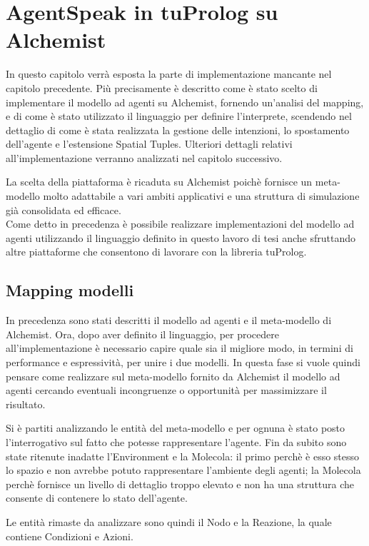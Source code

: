 \chapter{AgentSpeak in tuProlog su Alchemist}\label{chap:agentspeak-2p-alchemist}
In questo capitolo verrà esposta la parte di implementazione mancante nel capitolo precedente. Più precisamente è descritto come è stato scelto di implementare il modello ad agenti su Alchemist, fornendo un'analisi del mapping, e di come è stato utilizzato il linguaggio per definire l'interprete, scendendo nel dettaglio di come è stata realizzata la gestione delle intenzioni, lo spostamento dell'agente e l'estensione Spatial Tuples. Ulteriori dettagli relativi all'implementazione verranno analizzati nel capitolo successivo.

La scelta della piattaforma è ricaduta su Alchemist poichè fornisce un meta-modello molto adattabile a vari ambiti applicativi e una struttura di simulazione già consolidata ed efficace.
\\
Come detto in precedenza è possibile realizzare implementazioni del modello ad agenti utilizzando il linguaggio definito in questo lavoro di tesi anche sfruttando altre piattaforme che consentono di lavorare con la libreria tuProlog.

\section{Mapping modelli}\label{sctn:mapping}
In precedenza sono stati descritti il modello ad agenti e il meta-modello di Alchemist. Ora, dopo aver definito il linguaggio, per procedere all'implementazione è necessario capire quale sia il migliore modo, in termini di performance e espressività, per unire i due modelli.
In questa fase si vuole quindi pensare come realizzare sul meta-modello fornito da Alchemist il modello ad agenti cercando eventuali incongruenze o opportunità per massimizzare il risultato.

Si è partiti analizzando le entità del meta-modello e per ognuna è stato posto l'interrogativo sul fatto che potesse rappresentare l'agente.
Fin da subito sono state ritenute inadatte l'Environment e la Molecola: il primo perchè è esso stesso lo spazio e non avrebbe potuto rappresentare l'ambiente degli agenti; la Molecola perchè fornisce un livello di dettaglio troppo elevato e non ha una struttura che consente di contenere lo stato dell'agente.

Le entità rimaste da analizzare sono quindi il Nodo e la Reazione, la quale contiene Condizioni e Azioni.

